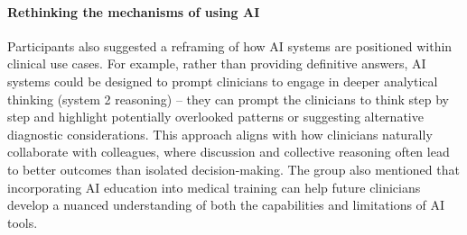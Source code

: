 \paragraph{Rethinking the mechanisms of using AI} 
Participants also suggested a reframing of how AI systems are positioned within clinical use cases. %
For example, rather than providing definitive answers, AI systems could be designed to prompt clinicians to engage in deeper analytical thinking (system 2 reasoning) -- they can prompt the clinicians to think step by step and highlight potentially overlooked patterns or suggesting alternative diagnostic considerations.
This approach aligns with how clinicians naturally collaborate with colleagues, where discussion and collective reasoning often lead to better outcomes than isolated decision-making.
The group also mentioned that incorporating AI education into medical training can help future clinicians develop a nuanced understanding of both the capabilities and limitations of AI tools.
